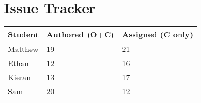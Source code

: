 \documentclass{article}
\begin{document}
\section{Issue Tracker}


\begin{table}[H]
\centering
\begin{tabular}{lll}
\toprule
\textbf{Student} & \textbf{Authored (O+C)} & \textbf{Assigned (C only)}\\
\midrule
Matthew & 19 & 21 \\
Ethan & 12 & 16 \\
Kieran & 13 & 17 \\
Sam & 20 & 12 \\
\bottomrule
\end{tabular}
\end{table}

\end{document}

